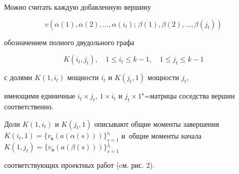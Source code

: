 






%

%






Можно считать каждую добавленную вершину

$$

v(\alpha(1), \alpha(2),\dots,\alpha(i_t);\, \beta (1), \beta

(2),\dots, \beta(j_t))

$$

обозначением полного двудольного  графа

$$

K (i_{t}, j_{t}), \quad  1\leq i_t \leq k-1, \quad  1\leq j_t \leq k-1

$$

с долями $K(1, i_t)$ мощности $i_t $ и $K(j_t, 1)$ мощности $j_t$,

имеющими единичные $i_t {\times} j_t$, $1{\times} i_t$ и $j_t{\times} 1$"=матрицы соседства вершин соответственно. 

Доли $K(1, i_t)$ и $K(j_t, 1)$ описывают общие моменты завершения $ K(i_t,1)=\{

v_{\text{к}}(a(\alpha(s)))\}_{s=1}^{i_t} $ и~общие моменты начала $

K(1, j_t)=\{v_{\text{н}}(a(\beta(s)))\}_{s=1}^{j_t }$

соответствующих проектных работ  (cм. рис. 2).













